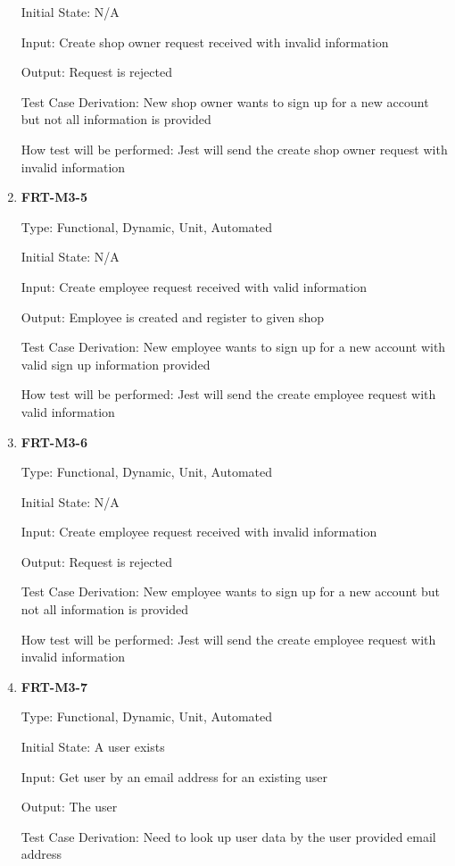 \documentclass[12pt, titlepage]{article}
\begin{document}
\begin{enumerate}
	      Initial State: N/A

	      Input: Create shop owner request received with invalid information

	      Output: Request is rejected

	      Test Case Derivation: New shop owner wants to sign up for a new account but not all information is
	      provided

	      How test will be performed: Jest will send the create shop owner request with invalid information

	\item \textbf{FRT-M3-5}

	      Type: Functional, Dynamic, Unit, Automated

	      Initial State: N/A

	      Input: Create employee request received with valid information

	      Output: Employee is created and register to given shop

	      Test Case Derivation: New employee wants to sign up for a new account with valid sign up
	      information provided

	      How test will be performed: Jest will send the create employee request with valid information

	\item \textbf{FRT-M3-6}

	      Type: Functional, Dynamic, Unit, Automated

	      Initial State: N/A

	      Input: Create employee request received with invalid information

	      Output: Request is rejected

	      Test Case Derivation: New employee wants to sign up for a new account but not all information is
	      provided

	      How test will be performed: Jest will send the create employee request with invalid information

	\item \textbf{FRT-M3-7}

	      Type: Functional, Dynamic, Unit, Automated

	      Initial State: A user exists

	      Input: Get user by an email address for an existing user

	      Output: The user

	      Test Case Derivation: Need to look up user data by the user provided email address


\end{enumerate}
\end{document}
